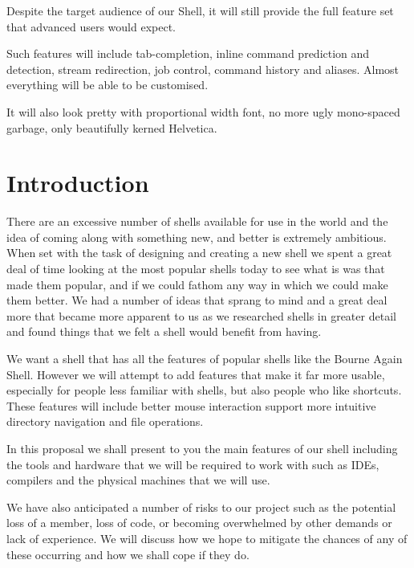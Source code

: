 \documentclass[a4paper,12pt]{article}
\begin{document}
Despite the target audience of our Shell, it will still provide the full feature set that advanced users would expect.

Such features will include tab-completion, inline command prediction and detection, stream redirection, job control,  command history and aliases. Almost everything will be able to be customised.

It will also look pretty with proportional width font, no more ugly mono-spaced garbage, only beautifully kerned Helvetica.
\null\vfill

\section*{Introduction}
There are an excessive number of shells available for use in the world and the idea of coming along with something new, and better is extremely ambitious. When set with the task of designing and creating a new shell we spent a great deal of time looking at the most popular shells today to see what is was that made them popular, and if we could fathom any way in which we could make them better. We had a number of ideas that sprang to mind and a great deal more that became more apparent to us as we researched shells in greater detail and found things that we felt a shell would benefit from having.

We want a shell that has all the features of popular shells like the Bourne Again Shell. However we will attempt to add features that make it far more usable, especially for people less familiar with shells, but also people who like shortcuts. These features will include better mouse interaction support more intuitive directory navigation and file operations. 

In this proposal we shall present to you the main features of our shell including the tools and hardware that we will be required to work with such as IDEs, compilers and the physical machines that we will use.


We have also anticipated a number of risks to our project such as the potential loss of a member, loss of code, or becoming overwhelmed by other demands or lack of experience. We will discuss how we hope to mitigate the chances of any of these occurring and how we shall cope if they do. 
\end{document}
